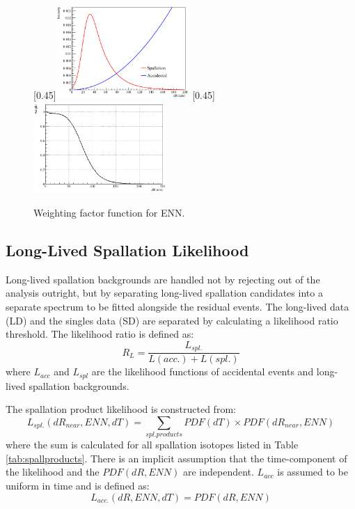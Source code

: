 \begin{figure}[htbp]
	\centering
	[0.45\textwidth]{\includegraphics[width=0.45\textwidth]{spall_dR.png}}
	\hfill
	[0.45\textwidth]{\includegraphics[width=0.45\textwidth]{ENN_dR.png}}
	\caption{Weighting factor function for ENN.}
	\label{fig:ENN_dR}
\end{figure}

\subsection*{Long-Lived Spallation Likelihood}
Long-lived spallation backgrounds are handled not by rejecting out of the analysis outright, but by separating long-lived spallation candidates into a separate spectrum to be fitted alongside the residual events. The long-lived data (LD) and the singles data (SD) are separated by calculating a likelihood ratio threshold. The likelihood ratio is defined as:
\begin{equation}
	R_L=\frac{L_{spl.}}{L(acc.)+L(spl.)}
\end{equation}
where $L_{acc}$ and $L_{spl}$ are the likelihood functions of accidental events and long-lived spallation backgrounds.

The spallation product likelihood is constructed from:
\begin{equation}
	L_{spl.}(dR_{near}, ENN, dT)=\sum_{spl. products}PDF(dT)\times PDF(dR_{near}, ENN)
\end{equation}
where the sum is calculated for all spallation isotopes listed in Table \ref{tab:spallproducts}. There is an implicit assumption that the time-component of the likelihood and the $PDF(dR, ENN)$ are independent. $L_{acc}$ is assumed to be uniform in time and is defined as:
\begin{equation}
	L_{acc.}(dR, ENN, dT) = PDF(dR, ENN)
\end{equation}

